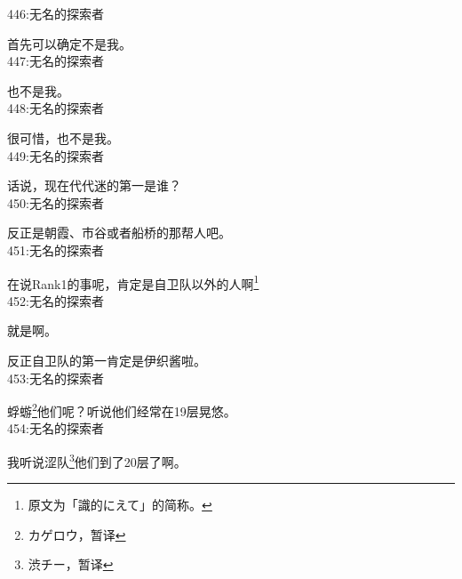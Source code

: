 446:无名的探索者

首先可以确定不是我。\\

447:无名的探索者

也不是我。\\

448:无名的探索者

很可惜，也不是我。\\

449:无名的探索者

话说，现在代代迷的第一是谁？\\

450:无名的探索者

反正是朝霞、市谷或者船桥的那帮人吧。\\

451:无名的探索者

在说Rank1的事呢，肯定是自卫队以外的人啊\footnote{原文为「識的にえて」的简称。}\\

452:无名的探索者

就是啊。

反正自卫队的第一肯定是伊织酱啦。\\

453:无名的探索者

蜉蝣\footnote{カゲロウ，暂译}他们呢？听说他们经常在19层晃悠。\\

454:无名的探索者

我听说涩队\footnote{渋チー，暂译}他们到了20层了啊。\\

